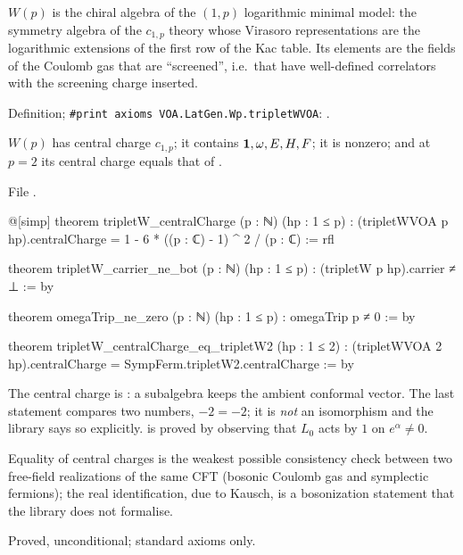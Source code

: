 \begin{physics}
$W(p)$ is the chiral algebra of the $(1,p)$ logarithmic minimal model: the symmetry algebra
of the $c_{1,p}$ theory whose Virasoro representations are the logarithmic extensions of the
first row of the Kac table. Its elements are the fields of the Coulomb gas that are ``screened'',
i.e.\ that have well-defined correlators with the screening charge inserted.
\end{physics}
\begin{status}
Definition; \texttt{\#print axioms VOA.LatGen.Wp.tripletWVOA}: .
\end{status}

\begin{theorem}\label{l18:thm:ccmatch}
$W(p)$ has central charge $c_{1,p}$; it contains $\mathbf{1},\omega,E,H,F$; it is nonzero; and at
$p=2$ its central charge equals that of .
\end{theorem}
\noindent File .
\begin{leancode}
@[simp] theorem tripletW_centralCharge (p : ℕ) (hp : 1 ≤ p) :
    (tripletWVOA p hp).centralCharge = 1 - 6 * ((p : ℂ) - 1) ^ 2 / (p : ℂ) := rfl

theorem tripletW_carrier_ne_bot (p : ℕ) (hp : 1 ≤ p) :
    (tripletW p hp).carrier ≠ ⊥ := by

theorem omegaTrip_ne_zero (p : ℕ) (hp : 1 ≤ p) : omegaTrip p ≠ 0 := by

theorem tripletW_centralCharge_eq_tripletW2 (hp : 1 ≤ 2) :
    (tripletWVOA 2 hp).centralCharge = SympFerm.tripletW2.centralCharge := by
\end{leancode}
\begin{dictionary}
The central charge is : a subalgebra keeps the ambient conformal vector. The last
statement compares two numbers, $-2=-2$; it is \emph{not} an isomorphism and the library says so
explicitly.  is proved by observing that $L_0$ acts by $1$ on $e^\alpha\ne0$.
\end{dictionary}
\begin{physics}
Equality of central charges is the weakest possible consistency check between two free-field
realizations of the same CFT (bosonic Coulomb gas and symplectic fermions); the real
identification, due to Kausch, is a bosonization statement that the library does not formalise.
\end{physics}
\begin{status}
Proved, unconditional; standard axioms only.
\end{status}


